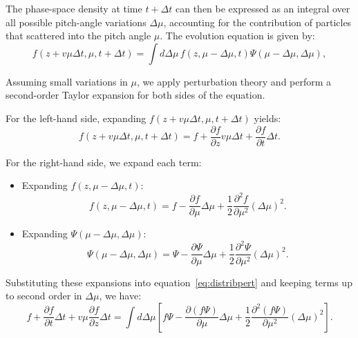 The phase-space density at time \( t + \Delta t \) can then be expressed as an integral over all possible pitch-angle variations \( \Delta\mu \), accounting for the contribution of particles that scattered into the pitch angle \( \mu \). The evolution equation is given by:
\begin{equation}
f(z + v\mu \Delta t, \mu, t + \Delta t) = \int d\Delta\mu \, f(z, \mu - \Delta\mu, t) \Psi(\mu - \Delta\mu, \Delta\mu),
\end{equation}

Assuming small variations in \( \mu \), we apply perturbation theory and perform a second-order Taylor expansion for both sides of the equation.

For the left-hand side, expanding \( f(z + v \mu \Delta t, \mu, t + \Delta t) \) yields:
\begin{equation}
f(z + v \mu \Delta t, \mu, t + \Delta t) = f + \frac{\partial f}{\partial z} v \mu \Delta t + \frac{\partial f}{\partial t} \Delta t.
\end{equation}

For the right-hand side, we expand each term:
%
\begin{itemize}
\item Expanding \( f(z, \mu - \Delta \mu, t) \):
\begin{equation}
f(z, \mu - \Delta \mu, t) = f - \frac{\partial f}{\partial \mu} \Delta \mu + \frac{1}{2} \frac{\partial^2 f}{\partial \mu^2} (\Delta \mu)^2.
\end{equation}

\item Expanding \( \Psi(\mu - \Delta \mu, \Delta \mu) \):
\begin{equation}
\Psi(\mu - \Delta \mu, \Delta \mu) = \Psi - \frac{\partial \Psi}{\partial \mu} \Delta \mu + \frac{1}{2} \frac{\partial^2 \Psi}{\partial \mu^2} (\Delta \mu)^2.
\end{equation}
\end{itemize}

Substituting these expansions into equation~\eqref{eq:distribpert} and keeping terms up to second order in \( \Delta \mu \), we have:
\begin{equation}
f + \frac{\partial f}{\partial t} \Delta t + v \mu \frac{\partial f}{\partial z} \Delta t = 
\int d\Delta \mu \left[ 
f \Psi 
- \frac{\partial (f \Psi)}{\partial \mu} \Delta \mu 
+ \frac{1}{2} \frac{\partial^2 (f \Psi)}{\partial \mu^2} (\Delta \mu)^2
\right].
\end{equation}

